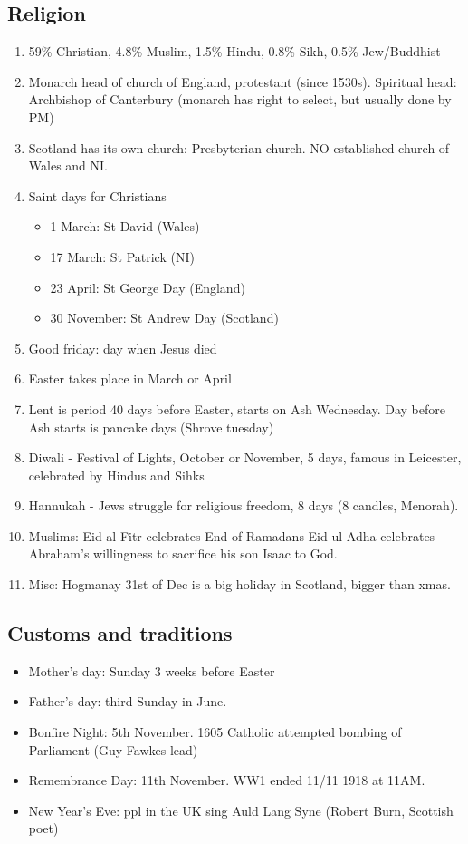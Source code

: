 \documentclass{amsart}
\begin{document}
\subsection{Religion}
\begin{enumerate}
\item 59\% Christian, 4.8\% Muslim, 1.5\% Hindu, 0.8\% Sikh, 0.5\% Jew/Buddhist 
\item Monarch head of church of England, protestant (since 1530s). Spiritual head: Archbishop of Canterbury (monarch has right to select, but usually done by PM)
\item Scotland has its own church: Presbyterian church. NO established church of Wales and NI. 
\item Saint days for Christians
	\begin{itemize}
		\item 1 March: St David  (Wales)
		\item 17 March: St Patrick  (NI)
		\item 23 April: St George Day (England)
		\item 30 November: St Andrew Day (Scotland)
	\end{itemize}
\item Good friday: day when Jesus died
\item Easter takes place in March or April
\item Lent is period 40 days before Easter, starts on Ash Wednesday. Day before Ash starts is pancake days (Shrove tuesday)
\item  Diwali - Festival of Lights, October or November, 5 days, famous in Leicester, celebrated by Hindus and Sihks
\item Hannukah - Jews struggle for religious freedom, 8 days (8 candles, Menorah).
\item Muslims: Eid al-Fitr celebrates End of Ramadans Eid ul Adha celebrates Abraham's willingness to sacrifice his son Isaac to God.
\item Misc: Hogmanay 31st of Dec is a big holiday in Scotland, bigger than xmas.
\end{enumerate}


\subsection{Customs and traditions} 
\begin{itemize}
\item Mother's day: Sunday 3 weeks before Easter
\item Father's day: third Sunday in June.
\item Bonfire Night: 5th November. 1605 Catholic attempted bombing of Parliament (Guy Fawkes lead)
\item Remembrance Day: 11th November. WW1 ended 11/11 1918 at 11AM. 
\item New Year's Eve: ppl in the UK sing Auld Lang Syne (Robert Burn, Scottish poet)
\end{itemize}
\end{document}
